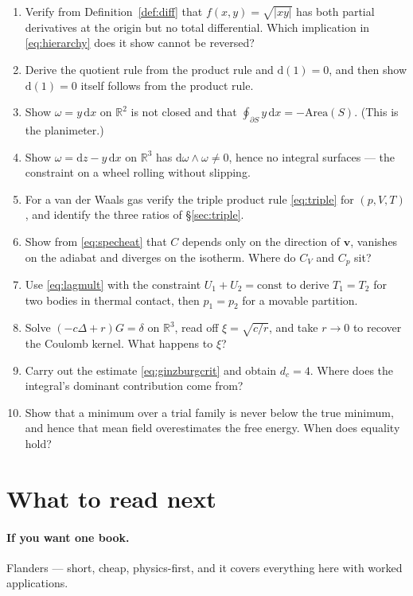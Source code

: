 \documentclass[10pt,a4paper]{article}
\newcommand{\dd}{\mathrm{d}}
\newcommand{\R}{\mathbb{R}}
\newcommand{\vv}{\mathbf{v}}
\theoremstyle{plain}
\theoremstyle{definition}
\numberwithin{equation}{section}
\begin{document}
\begin{enumerate}[leftmargin=1.9em,itemsep=3pt]
\item Verify from Definition~\ref{def:diff} that $f(x,y)=\sqrt{|xy|}$ has both partial
      derivatives at the origin but no total differential. Which implication in
      \eqref{eq:hierarchy} does it show cannot be reversed?
\item Derive the quotient rule from the product rule and $\dd(1)=0$, and then show $\dd(1)=0$
      itself follows from the product rule.
\item Show $\omega=y\,\dd x$ on $\R^2$ is not closed and that $\oint_{\partial S}y\,\dd x
      =-\mathrm{Area}(S)$. (This is the planimeter.)
\item Show $\omega=\dd z-y\,\dd x$ on $\R^3$ has $\dd\omega\wedge\omega\ne0$, hence no integral
      surfaces --- the constraint on a wheel rolling without slipping.
\item For a van der Waals gas verify the triple product rule \eqref{eq:triple} for $(p,V,T)$,
      and identify the three ratios of \S\ref{sec:triple}.
\item Show from \eqref{eq:specheat} that $C$ depends only on the direction of $\vv$, vanishes
      on the adiabat and diverges on the isotherm. Where do $C_V$ and $C_p$ sit?
\item Use \eqref{eq:lagmult} with the constraint $U_1+U_2=\text{const}$ to derive $T_1=T_2$ for
      two bodies in thermal contact, then $p_1=p_2$ for a movable partition.
\item Solve $(-c\Delta+r)G=\delta$ on $\R^3$, read off $\xi=\sqrt{c/r}$, and take $r\to0$ to
      recover the Coulomb kernel. What happens to $\xi$?
\item Carry out the estimate \eqref{eq:ginzburgcrit} and obtain $d_c=4$. Where does the
      integral's dominant contribution come from?
\item Show that a minimum over a trial family is never below the true minimum, and hence that
      mean field overestimates the free energy. When does equality hold?
\end{enumerate}

\section{What to read next}

\paragraph{If you want one book.} Flanders \cite{Flanders} --- short, cheap, physics-first, and
it covers everything here with worked applications.
\end{document}
